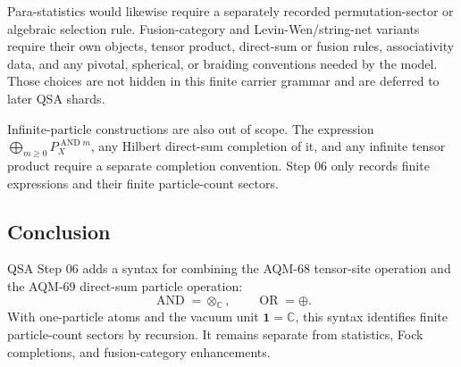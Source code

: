 Para-statistics would likewise require a separately recorded permutation-sector
or algebraic selection rule.  Fusion-category and Levin-Wen/string-net
variants require their own objects, tensor product, direct-sum or fusion
rules, associativity data, and any pivotal, spherical, or braiding conventions
needed by the model.  Those choices are not hidden in this finite carrier
grammar and are deferred to later QSA shards.

Infinite-particle constructions are also out of scope.  The expression
\(\bigoplus_{m\geq0}P_X^{\operatorname{AND}m}\), any Hilbert direct-sum
completion of it, and any infinite tensor product require a separate
completion convention.  Step 06 only records finite expressions and their
finite particle-count sectors.

\subsection{Conclusion}

QSA Step 06 adds a syntax for combining the AQM-68 tensor-site operation and
the AQM-69 direct-sum particle operation:
\[
  \operatorname{AND}=\otimes_{\mathbb C},
  \qquad
  \operatorname{OR}=\oplus.
\]
With one-particle atoms and the vacuum unit \(\mathbf 1=\mathbb C\), this
syntax identifies finite particle-count sectors by recursion.  It remains
separate from statistics, Fock completions, and fusion-category enhancements.

